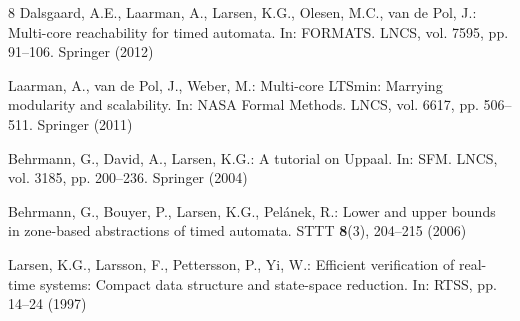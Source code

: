\documentclass[11pt]{article}
\begin{document}
\begin{thebibliography}{8}
Dalsgaard, A.E., Laarman, A., Larsen, K.G., Olesen, M.C., van de Pol, J.:
Multi-core reachability for timed automata. In: FORMATS. LNCS, vol. 7595, pp. 91--106.
Springer (2012)

Laarman, A., van de Pol, J., Weber, M.: Multi-core LTSmin: Marrying modularity and
scalability. In: NASA Formal Methods. LNCS, vol. 6617, pp. 506--511. Springer (2011)

Behrmann, G., David, A., Larsen, K.G.: A tutorial on Uppaal. In: SFM. LNCS, vol. 3185,
pp. 200--236. Springer (2004)

Behrmann, G., Bouyer, P., Larsen, K.G., Pel\'{a}nek, R.: Lower and upper bounds in zone-based
abstractions of timed automata. STTT \textbf{8}(3), 204--215 (2006)

Larsen, K.G., Larsson, F., Pettersson, P., Yi, W.: Efficient verification of real-time
systems: Compact data structure and state-space reduction. In: RTSS, pp. 14--24 (1997)
\end{thebibliography}
\end{document}
